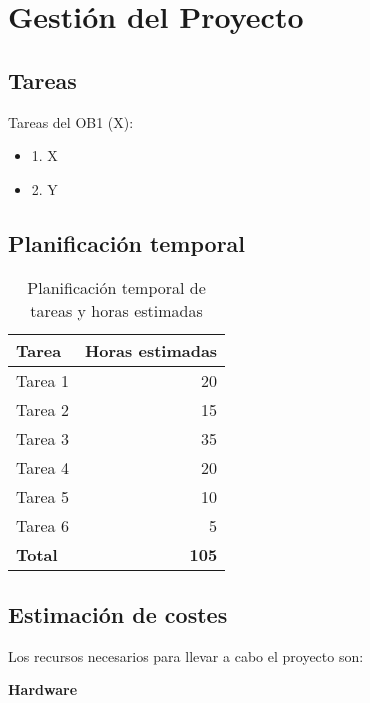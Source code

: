 \chapter{Gestión del Proyecto}\label{cap:planif}

\section{Tareas}

Tareas del OB1 (X):

\begin{itemize}
    \item 1. X
    \item 2. Y
\end{itemize}

\section{Planificación temporal}

\begin{table}[h!]
    \centering
    \begin{tabular}{|l|r|}
        \hline
        \textbf{Tarea} & \textbf{Horas estimadas} \\
        \hline
        Tarea 1        & 20                       \\
        Tarea 2        & 15                       \\
        Tarea 3        & 35                       \\
        Tarea 4        & 20                       \\
        Tarea 5        & 10                       \\
        Tarea 6        & 5                        \\
        \hline
        \textbf{Total} & \textbf{105}             \\
        \hline
    \end{tabular}
    \caption{Planificación temporal de tareas y horas estimadas}
    \label{tab:planificacion-temporal}
\end{table}

\section{Estimación de costes}

Los recursos necesarios para llevar a cabo el proyecto son:


\textbf{Hardware}

